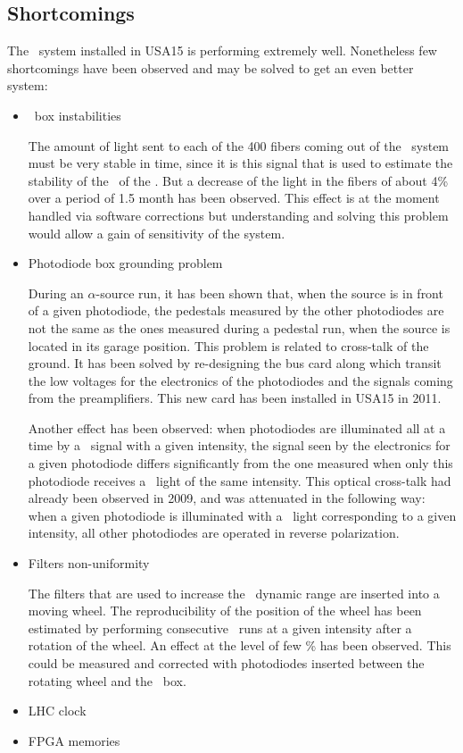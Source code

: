 \subsection{Shortcomings}
The \las~system installed in USA15 is performing extremely well. Nonetheless few shortcomings have been observed and may be solved to get an even better system:
\begin{itemize}
\item{\coimbra~box instabilities} 
	
	The amount of light sent to each of the 400 fibers coming out of the \coimbra~system must be very stable in time, since it is this signal that is used to estimate the stability of the \pmts~of the \tilecal. But a decrease of the light in the fibers of about 4\% over a period of 1.5 month has been observed. This effect is at the moment handled via software corrections but understanding and solving this problem would allow a gain of sensitivity of the system.
	
\item{Photodiode box grounding problem} 
	
	During an $\alpha$-source run, it has been shown that, when the source is in front of a given photodiode, the pedestals measured by the other photodiodes are not the same as the ones measured during a pedestal run, when the source is located in its garage position. This problem is related to cross-talk of the ground. It has been solved by re-designing the bus card along which transit the low voltages for the electronics of the photodiodes and the signals coming from the preamplifiers. This new card has been installed in USA15 in 2011. \par
	Another effect has been observed: when photodiodes are illuminated all at a time by a \las~signal with a given intensity, the signal seen by the electronics for a given photodiode differs significantly from the one measured when only this photodiode receives a \las~light of the same intensity. This optical cross-talk had already been observed in 2009, and was attenuated in the following way: when a given photodiode is illuminated with a \las~light corresponding to a given intensity, all other photodiodes are operated in reverse polarization.
		
\item{Filters non-uniformity}
	
	The filters that are used to increase the \las~dynamic range are inserted into a moving wheel. The reproducibility of the position of the wheel has been estimated by performing consecutive \las~runs at a given intensity after a rotation of the wheel. An effect at the level of few \% has been observed. This could be measured and corrected with photodiodes inserted between the rotating wheel and the \coimbra~box.
	
\item{LHC clock}


\item{FPGA memories}



\end{itemize}
